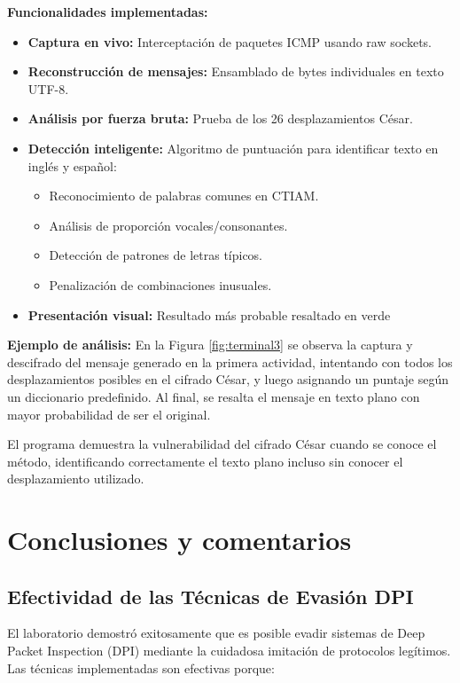 \documentclass[letter,12pt]{article}
\begin{document}
\textbf{Funcionalidades implementadas:}
\begin{itemize}
    \item \textbf{Captura en vivo:} Interceptación de paquetes ICMP usando raw sockets.
    \item \textbf{Reconstrucción de mensajes:} Ensamblado de bytes individuales en texto UTF-8.
    \item \textbf{Análisis por fuerza bruta:} Prueba de los 26 desplazamientos César.
    \item \textbf{Detección inteligente:} Algoritmo de puntuación para identificar texto en inglés y español:
    \begin{itemize}
        \item Reconocimiento de palabras comunes en CTIAM.
        \item Análisis de proporción vocales/consonantes.
        \item Detección de patrones de letras típicos.
        \item Penalización de combinaciones inusuales.
    \end{itemize}
    \item \textbf{Presentación visual:} Resultado más probable resaltado en verde
\end{itemize}

\textbf{Ejemplo de análisis:} En la Figura \ref{fig:terminal3} se observa la captura y descifrado del mensaje generado en la primera actividad, intentando con todos los desplazamientos posibles en el cifrado César, y luego asignando un puntaje según un diccionario predefinido. Al final, se resalta el mensaje en texto plano con mayor probabilidad de ser el original.

El programa demuestra la vulnerabilidad del cifrado César cuando se conoce el método, identificando correctamente el texto plano incluso sin conocer el desplazamiento utilizado.

\section*{Conclusiones y comentarios}

\subsection*{Efectividad de las Técnicas de Evasión DPI}

El laboratorio demostró exitosamente que es posible evadir sistemas de Deep Packet Inspection (DPI) mediante la cuidadosa imitación de protocolos legítimos. Las técnicas implementadas son efectivas porque:
\end{document}
